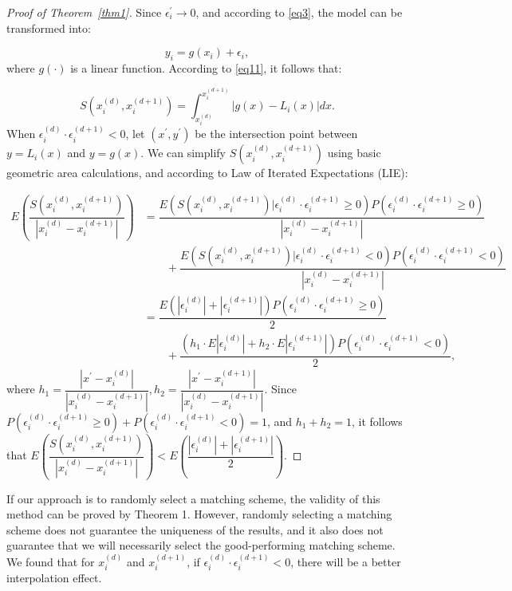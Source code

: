 \documentclass[sn-mathphys,Numbered]{sn-jnl}%
\theoremstyle{thmstyleone}%
\theoremstyle{thmstyletwo}%
\theoremstyle{thmstylethree}%
\begin{document}
\begin{proof}[Proof of Theorem~{\upshape\ref{thm1}}]

Since $\epsilon_i^\prime\rightarrow0$, and according to \eqref{eq3}, the model can be transformed into:

\begin{equation}
y_i=g(x_i)+\epsilon_i,\nonumber
\end{equation}
where $g(\cdot)$ is a linear function. According to \eqref{eq11}, it follows that:

\begin{equation}
S(x_i^{(d)},x_i^{(d+1)})=\int_{x_i^{(d)}}^{x_i^{(d+1)}}|g(x)-L_i(x)|dx.\nonumber
\end{equation}
When $\epsilon_i^{{(d)}}\cdot\epsilon_i^{{(d+1)}}<0$, let $(x^\prime,y^\prime)$ be the intersection point between $y=L_i(x)$ and $y=g(x)$. We can simplify $S(x_i^{(d)},x_i^{{(d+1)}})$ using basic geometric area calculations, and according to Law of Iterated Expectations (LIE):

\begin{align*}
E\left(\dfrac{S(x_i^{(d)},x_i^{(d+1)})}{|x_i^{(d)}-x_i^{(d+1)}|} \right)
&=\dfrac{E\left(S(x_i^{(d)},x_i^{(d+1)})|\epsilon_i^{(d)}\cdot\epsilon_i^{(d+1)}\ge0 \right)P(\epsilon_i^{(d)}\cdot\epsilon_i^{(d+1)}\ge0)}{|x_i^{(d)}-x_i^{(d+1)}|} \\
&\qquad+\dfrac{E\left(S(x_i^{(d)},x_i^{(d+1)})|\epsilon_i^{(d)}\cdot\epsilon_i^{(d+1)}<0 \right)P(\epsilon_i^{(d)}\cdot\epsilon_i^{(d+1)}<0)}{|x_i^{(d)}-x_i^{(d+1)}|} \\
&=\dfrac{E\left(|\epsilon_i^{(d)}|+|\epsilon_i^{(d+1)}|\right)P(\epsilon_i^{(d)}\cdot\epsilon_i^{(d+1)}\ge0)}{2} \\
&\qquad+\dfrac{\left(h_1\cdot E|\epsilon_i^{(d)}|+h_2\cdot E|\epsilon_i^{(d+1)}| \right)P(\epsilon_i^{(d)}\cdot\epsilon_i^{(d+1)}<0)}{2}, 
\end{align*}
where $h_1=\dfrac{|x^\prime-x_i^{(d)}|}{|x_i^{(d)}-x_i^{(d+1)}|},h_2=\dfrac{|x^\prime-x_i^{(d+1)}|}{|x_i^{(d)}-x_i^{(d+1)}|}$. Since $P(\epsilon_i^{(d)}\cdot \epsilon_i^{(d+1)}\ge0)+P(\epsilon_i^{(d)}\cdot \epsilon_i^{(d+1)}<0)=1$, and $h_1+h_2=1$, it follows that $E\left(\dfrac{S(x_i^{(d)},x_i^{{(d+1)}})}{|x_i^{(d)}-x_i^{(d+1)}|} \right)<E\left(\dfrac{|\epsilon_i^{(d)}|+|\epsilon_i^{{(d+1)}}|}{2} \right)$.

\end{proof}

If our approach is to randomly select a matching scheme, the validity of this method can be proved by Theorem 1. However, randomly selecting a matching scheme does not guarantee the uniqueness of the results, and it also does not guarantee that we will necessarily select the good-performing matching scheme. We found that for $x_i^{{(d)}}$ and $x_i^{{(d+1)}}$, if $\epsilon_i^{{(d)}}\cdot\epsilon_i^{{(d+1)}}<0$, there will be a better interpolation effect.
\end{document}
